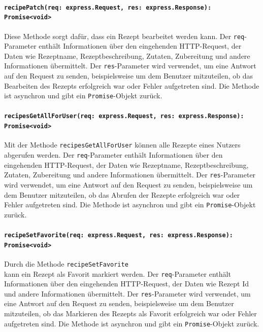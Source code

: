 \documentclass{entwurfsheft}
\begin{document}
\begin{sloppypar}
\paragraph{\texttt{recipePatch(req: express.Request, res: express.Response): Promise<void>\\}}
Diese Methode sorgt dafür, dass ein Rezept bearbeitet werden kann. Der \texttt{req}-Parameter enthält Informationen über den eingehenden HTTP-Request, der Daten wie Rezeptname, Rezeptbeschreibung, Zutaten, Zubereitung und andere Informationen übermittelt. Der \texttt{res}-Parameter wird verwendet, um eine Antwort auf den Request zu senden, beispielsweise um dem Benutzer mitzuteilen, ob das Bearbeiten des Rezepts erfolgreich war oder Fehler aufgetreten sind.
Die Methode ist asynchron und gibt ein \texttt{Promise}-Objekt zurück.

\paragraph{\texttt{recipesGetAllForUser(req: express.Request, res: express.Response): Promise<void>\\}}
Mit der Methode \texttt{recipesGetAllForUser} können alle Rezepte eines Nutzers abgerufen werden. Der \texttt{req}-Parameter enthält Informationen über den eingehenden HTTP-Request, der Daten wie Rezeptname, Rezeptbeschreibung, Zutaten, Zubereitung und andere Informationen übermittelt. Der \texttt{res}-Parameter wird verwendet, um eine Antwort auf den Request zu senden, beispielsweise um dem Benutzer mitzuteilen, ob das Abrufen der Rezepte erfolgreich war oder Fehler aufgetreten sind.
Die Methode ist asynchron und gibt ein \texttt{Promise}-Objekt zurück.
\paragraph{\texttt{recipeSetFavorite(req: express.Request, res: express.Response): Promise<void>\\}}
Durch die Methode \texttt{recipeSetFavorite\\} kann ein Rezept als Favorit markiert werden. Der \texttt{req}-Parameter enthält Informationen über den eingehenden HTTP-Request, der Daten wie Rezept Id und andere Informationen übermittelt. Der \texttt{res}-Parameter wird verwendet, um eine Antwort auf den Request zu senden, beispielsweise um dem Benutzer mitzuteilen, ob das Markieren des Rezepts als Favorit erfolgreich war oder Fehler aufgetreten sind.
Die Methode ist asynchron und gibt ein \texttt{Promise}-Objekt zurück.

\end{sloppypar}
\end{document}
